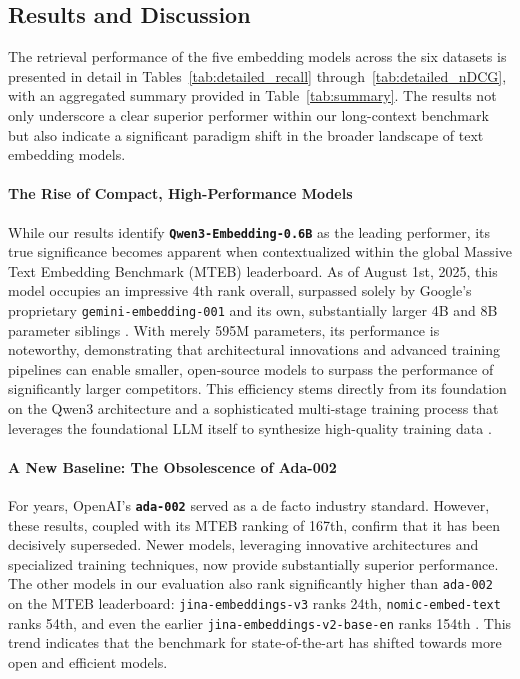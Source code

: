 \subsection{Results and Discussion}
The retrieval performance of the five embedding models across the six datasets is presented in detail in Tables~\ref{tab:detailed_recall} through~\ref{tab:detailed_nDCG}, with an aggregated summary provided in Table~\ref{tab:summary}. The results not only underscore a clear superior performer within our long-context benchmark but also indicate a significant paradigm shift in the broader landscape of text embedding models.

\paragraph{The Rise of Compact, High-Performance Models}
While our results identify \textbf{\texttt{Qwen3-Embedding-0.6B}} as the leading performer, its true significance becomes apparent when contextualized within the global Massive Text Embedding Benchmark (MTEB) leaderboard. As of August 1st, 2025, this model occupies an impressive 4th rank overall, surpassed solely by Google's proprietary \texttt{gemini-embedding-001} and its own, substantially larger 4B and 8B parameter siblings \autocite{mteb_leaderboard_2025}. With merely 595M parameters, its performance is noteworthy, demonstrating that architectural innovations and advanced training pipelines can enable smaller, open-source models to surpass the performance of significantly larger competitors. This efficiency stems directly from its foundation on the Qwen3 architecture \autocite{yang2025qwen3technicalreport} and a sophisticated multi-stage training process that leverages the foundational LLM itself to synthesize high-quality training data \autocite{zhang2025qwen3embeddingadvancingtext}.

\paragraph{A New Baseline: The Obsolescence of Ada-002}
For years, OpenAI's \textbf{\texttt{ada-002}} served as a de facto industry standard. However, these results, coupled with its MTEB ranking of 167th, confirm that it has been decisively superseded. Newer models, leveraging innovative architectures and specialized training techniques, now provide substantially superior performance. The other models in our evaluation also rank significantly higher than \texttt{ada-002} on the MTEB leaderboard: \texttt{jina-embeddings-v3} ranks 24th, \texttt{nomic-embed-text} ranks 54th, and even the earlier \texttt{jina-embeddings-v2-base-en} ranks 154th \autocite{mteb_leaderboard_2025}. This trend indicates that the benchmark for state-of-the-art has shifted towards more open and efficient models.

